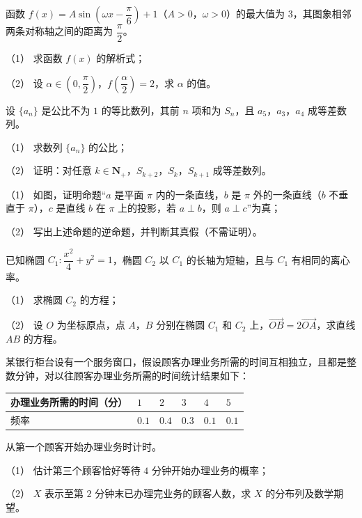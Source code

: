 \begin{question}
函数 $f(x)=A\sin\left(\omega x-\dfrac\pi6\right)+1$（$A>0$，$\omega>0$）的最大值为 $3$，其图象相邻两条对称轴之间的距离为 $\dfrac\pi2$。

（1） 求函数 $f(x)$ 的解析式；

（2） 设 $\alpha\in\left(0,\dfrac\pi2\right)$，$f\left(\dfrac\alpha2\right)=2$，求 $\alpha$ 的值。

\end{question}
\begin{question}
设 $\{a_n\}$ 是公比不为 $1$ 的等比数列，其前 $n$ 项和为 $S_n$，且 $a_5$，$a_3$，$a_4$ 成等差数列。

（1） 求数列 $\{a_n\}$ 的公比；

（2） 证明：对任意 $k\in\mathbf N_+$，$S_{k+2}$，$S_k$，$S_{k+1}$ 成等差数列。

\Needspace{0.4\textheight}
\end{question}
\begin{question}
（1） 如图，证明命题“$a$ 是平面 $\pi$ 内的一条直线，$b$ 是 $\pi$ 外的一条直线（$b$ 不垂直于 $\pi$），$c$ 是直线 $b$ 在 $\pi$ 上的投影，若 $a\perp b$，则 $a\perp c$”为真；

（2） 写出上述命题的逆命题，并判断其真假（不需证明）。
\nopagebreak[4]
\begin{center}\end{center}
\nopagebreak[4]
\end{question}
\begin{question}
已知椭圆 $C_1:\dfrac{x^2}4+y^2=1$，椭圆 $C_2$ 以 $C_1$ 的长轴为短轴，且与 $C_1$ 有相同的离心率。

（1） 求椭圆 $C_2$ 的方程；

（2） 设 $O$ 为坐标原点，点 $A$，$B$ 分别在椭圆 $C_1$ 和 $C_2$ 上，$\overrightarrow{OB}=2\overrightarrow{OA}$，求直线 $AB$ 的方程。

\end{question}
\begin{question}
某银行柜台设有一个服务窗口，假设顾客办理业务所需的时间互相独立，且都是整数分钟，对以往顾客办理业务所需的时间统计结果如下：

\begin{center}
\begin{tabular}{llllll}
\toprule
办理业务所需的时间（分） & $1$ & $2$ & $3$ & $4$ & $5$ \\
\midrule
频率 & $0.1$ & $0.4$ & $0.3$ & $0.1$ & $0.1$ \\
\bottomrule
\end{tabular}
\end{center}

从第一个顾客开始办理业务时计时。

（1） 估计第三个顾客恰好等待 $4$ 分钟开始办理业务的概率；

（2） $X$ 表示至第 $2$ 分钟末已办理完业务的顾客人数，求 $X$ 的分布列及数学期望。

\end{question}
